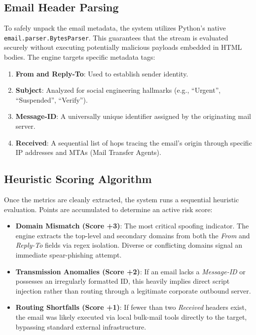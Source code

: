 \documentclass[conference]{IEEEtran}
\begin{document}
\subsection{Email Header Parsing}
To safely unpack the email metadata, the system utilizes Python's native \texttt{email.parser.BytesParser}. This guarantees that the stream is evaluated securely without executing potentially malicious payloads embedded in HTML bodies. The engine targets specific metadata tags:
\begin{enumerate}
    \item \textbf{From and Reply-To}: Used to establish sender identity.
    \item \textbf{Subject}: Analyzed for social engineering hallmarks (e.g., ``Urgent'', ``Suspended'', ``Verify'').
    \item \textbf{Message-ID}: A universally unique identifier assigned by the originating mail server.
    \item \textbf{Received}: A sequential list of hops tracing the email's origin through specific IP addresses and MTAs (Mail Transfer Agents).
\end{enumerate}

\subsection{Heuristic Scoring Algorithm}
Once the metrics are cleanly extracted, the system runs a sequential heuristic evaluation. Points are accumulated to determine an active risk score:
\begin{itemize}
    \item \textbf{Domain Mismatch (Score +3)}: The most critical spoofing indicator. The engine extracts the top-level and secondary domains from both the \textit{From} and \textit{Reply-To} fields via regex isolation. Diverse or conflicting domains signal an immediate spear-phishing attempt.
    \item \textbf{Transmission Anomalies (Score +2)}: If an email lacks a \textit{Message-ID} or possesses an irregularly formatted ID, this heavily implies direct script injection rather than routing through a legitimate corporate outbound server.
    \item \textbf{Routing Shortfalls (Score +1)}: If fewer than two \textit{Received} headers exist, the email was likely executed via local bulk-mail tools directly to the target, bypassing standard external infrastructure.
\end{itemize}
\end{document}
